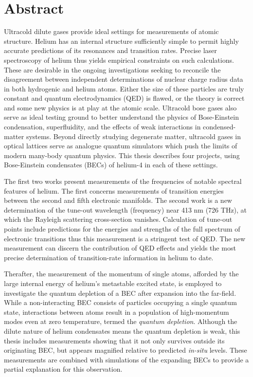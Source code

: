 \section*{Abstract}

Ultracold dilute gases provide ideal settings for measurements of atomic structure. 
Helium has an internal structure sufficiently simple to permit highly accurate predictions of its resonances and transition rates.
Precise laser spectroscopy of helium thus yields empirical constraints on such calculations.
These are desirable in the ongoing investigations seeking to reconcile the disagreement between independent determinations of nuclear charge radius data in both hydrogenic and helium atoms.
Either the size of these particles are truly constant and quantum electrodynamics (QED) is flawed, or the theory is correct and some new physics is at play at the atomic scale.
Ultracold bose gases also serve as ideal testing ground to better understand the physics of Bose-Einstein condensation, superfluidity, and the effects of weak interactions in condensed-matter systems.
Beyond directly studying degenerate matter, ultracold gases in optical lattices serve as analogue quantum simulators which push the limits of modern many-body quantum physics. 
This thesis describes four projects, using Bose-Einstein condensates (BECs) of helium-4 in each of these settings.


The first two works present measurements of the frequencies of notable spectral features of helium.
The first concerns measurements of transition energies between the second and fifth electronic manifolds.
The second work is a new determination of the tune-out wavelength (frequency) near 413 nm (726 THz), at which the Rayleigh scattering cross-section vanishes. 
Calculation of tune-out points include predictions for the energies and strengths of the full spectrum of electronic transitions thus this measurement is a stringent test of QED.
The new measurement can discern the contribution of QED effects and yields the most precise determination of transition-rate information in helium to date.

Therafter, the measurement of the momentum of single atoms, afforded by the large internal energy of helium's metastable excited state, is employed to investigate the quantum depletion of a BEC after expansion into the far-field.
While a non-interacting BEC consists of particles occupying a single quantum state, interactions between atoms result in a population of high-momentum modes even at zero temperature, termed the \emph{quantum depletion}.
Although the dilute nature of helium condensates means the quantum depletion is weak, this thesis includes measurements showing that it not only survives outside its originating BEC, but appears magnified relative to predicted \emph{in-situ} levels.
These measurements are combined with simulations of the expanding BECs to provide a partial explanation for this observation.



